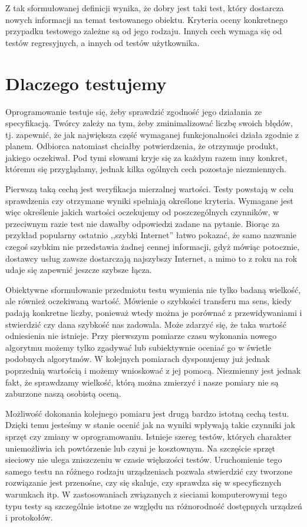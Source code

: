 \documentclass[00-praca-magisterska.tex]{subfiles}
\begin{document}
Z tak sformułowanej definicji wynika, że dobry jest taki test, który dostarcza
nowych informacji na temat testowanego obiektu. Kryteria oceny konkretnego
przypadku testowego zależne są od jego rodzaju. Innych cech wymaga się od
testów regresyjnych, a innych od testów użytkownika.

\section{Dlaczego testujemy}
\label{dlaczego-testujemy}

Oprogramowanie testuje się, żeby sprawdzić zgodność jego działania ze
specyfikacją. Twórcy zależy na tym, żeby zminimalizować liczbę swoich błędów,
tj. zapewnić, że jak największa część wymaganej funkcjonalności działa zgodnie
z planem. Odbiorca natomiast chciałby potwierdzenia, że otrzymuje produkt,
jakiego oczekiwał. Pod tymi słowami kryje się za każdym razem inny konkret,
któremu się przyglądamy, jednak kilka ogólnych cech pozostaje niezmiennych.

Pierwszą taką cechą jest weryfikacja mierzalnej wartości. Testy powstają w celu
sprawdzenia czy otrzymane wyniki spełniają określone kryteria. Wymagane jest
więc określenie jakich wartości oczekujemy od poszczególnych czynników, w
przeciwnym razie test nie dawałby odpowiedzi zadane na pytanie. Biorąc za
przykład popularny ostatnio ,,szybki Internet'' łatwo pokazać, że samo nazwanie
czegoś szybkim nie przedstawia żadnej cennej informacji, gdyż mówiąc potocznie,
dostawcy usług zawsze dostarczają najszybszy Internet, a mimo to z roku na rok
udaje się zapewnić jeszcze szybsze łącza. 

Obiektywne sformułowanie przedmiotu testu wymienia nie tylko badaną wielkość,
ale również oczekiwaną wartość. Mówienie o szybkości transferu ma sens, kiedy
padają konkretne liczby, ponieważ wtedy można je porównać z przewidywaniami i
stwierdzić czy dana szybkość nas zadowala. Może zdarzyć się, że taka wartość
odniesienia nie istnieje. Przy pierwszym pomiarze czasu wykonania nowego
algorytmu możemy tylko zgadywać lub subiektywnie oceniać go w świetle podobnych
algorytmów. W kolejnych pomiarach dysponujemy już jednak poprzednią wartością i
możemy wnioskować z jej pomocą. Niezmienny jest jednak fakt, że sprawdzamy
wielkość, którą można zmierzyć i nasze pomiary nie są zaburzone naszą osobistą
oceną.

Możliwość dokonania kolejnego pomiaru jest drugą bardzo istotną cechą testu.
Dzięki temu jesteśmy w stanie ocenić jak na wyniki wpływają takie czynniki jak
sprzęt czy zmiany w oprogramowaniu. Istnieje szereg testów, których charakter
uniemożliwia ich powtórzenie lub czyni je kosztownym. Na szczęście sprzęt
sieciowy nie ulega zniszczeniu w czasie większości testów. Uruchomienie tego
samego testu na różnego rodzaju urządzeniach pozwala stwierdzić czy tworzone
rozwiązanie jest przenośne, czy się skaluje, czy sprawdza się w specyficznych
warunkach itp. W zastosowaniach związanych z sieciami komputerowymi tego typu
testy są szczególnie istotne ze względu na różnorodność dostępnych urządzeń i
protokołów.
\end{document}
